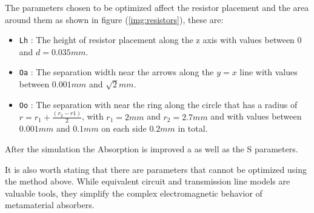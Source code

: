         The parameters chosen to be optimized affect the resistor placement and the area around 
        them as shown in figure (\ref{img:resistors}), these are:
        \begin{itemize}
            \item \texttt{Lh} : The height of resistor placement along the \textsf{z} axis
                with values between 0 and $d=0.035mm$.
            \item \texttt{Oa} : The separation width near the arrows along the $y=x$ line
                with values between $0.001mm$ and $\sqrt{2}mm$.
            \item \texttt{Oo} : The separation with near the ring along the circle that has a 
                radius of $r=r_1+\frac{(r_2-r1)}{2}$, with $r_1=2mm$ and $r_2=2.7mm$ and with 
                values between $0.001mm$ and $0.1mm$ on each side $0.2mm$ in total.
        \end{itemize}
        
        After the simulation the Absorption is improved a as well as the S parameters.
        
        
        It is also worth stating that there are parameters that cannot be optimized using the
        method above. While equivalent circuit and transmission line models are valuable tools, 
        they simplify the complex electromagnetic behavior of metamaterial absorbers. 

